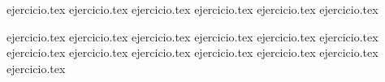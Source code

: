 \begin{enumerate}
    \setcounter{enumi}{44}
    {ejercicio.tex}
    {ejercicio.tex}
    {ejercicio.tex}
    {ejercicio.tex}
    {ejercicio.tex}
    {ejercicio.tex}
\end{enumerate}

\vspace{1em}
\begin{enumerate}
    \setcounter{enumi}{50}
    {ejercicio.tex}
    {ejercicio.tex}
    {ejercicio.tex}
    {ejercicio.tex}
    {ejercicio.tex}
    {ejercicio.tex}
    {ejercicio.tex}
    {ejercicio.tex}
    {ejercicio.tex}
    {ejercicio.tex}
    {ejercicio.tex}
    {ejercicio.tex}
    {ejercicio.tex}
\end{enumerate}
